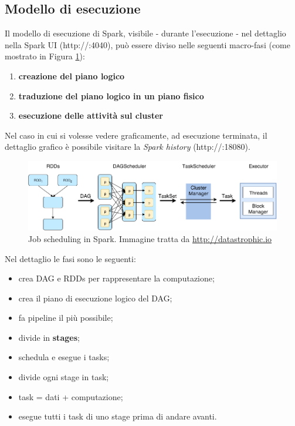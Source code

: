 \documentclass[12pt,italian]{article}
\begin{document}
\subsection{Modello di esecuzione} 
Il modello di esecuzione di Spark, visibile - durante l'esecuzione - nel dettaglio nella Spark UI (http://:4040), può essere diviso nelle seguenti macro-fasi (come mostrato in Figura \ref{fig:model}):
\begin{enumerate}
	\item \textbf{creazione del piano logico}
	\item \textbf{traduzione del piano logico in un piano fisico}
	\item \textbf{esecuzione delle attività sul cluster}
\end{enumerate}
Nel caso in cui si volesse vedere graficamente, ad esecuzione terminata, il dettaglio grafico è possibile visitare la \textit{Spark history} (http://:18080).
\begin{figure}[H]
	\centering 
	\includegraphics[width=1\linewidth]{img/model.png}
	\caption{Job scheduling in Spark. Immagine tratta da \url{http://datastrophic.io}}
	\label{fig:model}
\end{figure}
Nel dettaglio le fasi sono le seguenti: %
\begin{itemize}
	\item crea DAG e RDDs per rappresentare la computazione;
	\item crea il piano di esecuzione logico del DAG;
	\item fa pipeline il più possibile;
	\item divide in \textbf{stages};
	\item schedula e esegue i tasks;
	\item divide ogni stage in task;
	\item task = dati + computazione;
	\item esegue tutti i task di uno stage prima di andare avanti.
\end{itemize}
\end{document}
